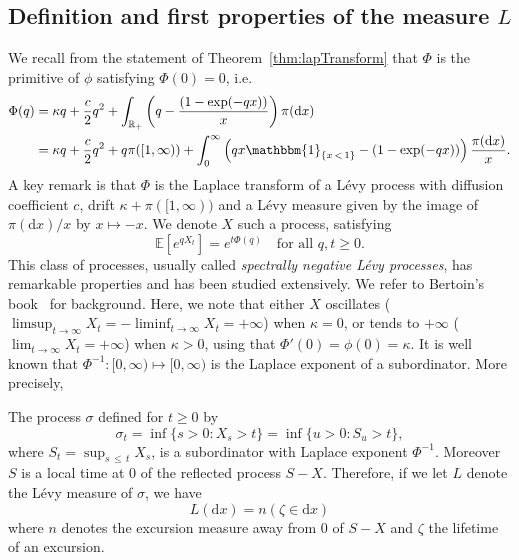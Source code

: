 \documentclass[AHL,Unicode,longabstracts,published]{cedram}
\newcommand{\R}{\mathbb{R}}
\newcommand{\bbE}{\mathbb{E}}
\newcommand{\dd}{\mathrm{d}}
\newcommand{\ind}[1]{\mathbbm{1}_{\left\{#1\right\}}}
\begin{document}
\subsection{Definition and first properties of the measure \texorpdfstring{$L$}{L}}\label{sec:L}

We recall from the statement of Theorem~\ref{thm:lapTransform} that $\Phi$ is the primitive of $\phi$ satisfying $\Phi(0) = 0$, i.e.
\begin{align}\label{LK_Phi}
\Phi(q)&=\kappa q+\frac{c}{2}q^2+\int_{\R _+} \left(q-\frac{\left(1-\exp(-qx)\right)}{x}\right)\pi(\dd x) \\
\nonumber &= \kappa q+\frac{c}{2}q^2+ q \pi([1,\infty))+\int_0^{\infty} \left(qx \ind{x\,<\,1} -\left(1-\exp(-qx)\right)\right) \frac{\pi(\dd x)}{x}.
\end{align}
A key remark is that $\Phi$ is the Laplace transform of a Lévy process with diffusion coefficient $c$, drift $\kappa + \pi([1,\infty))$ and a Lévy measure given by the image of $\pi(\dd x)/x$ by $x \mapsto -x$. We denote $X$ such a process, satisfying
\begin{equation*}\label{def_X}
\bbE\left[e^{qX_t}\right]=e^{t \Phi(q)} \quad \text{for all } q,t \geq 0.
\end{equation*}
This class of processes, usually called \emph{spectrally negative Lévy processes}, has remarkable properties and has been studied extensively. We refer to Bertoin's book~\cite[Chapter~VII]{BLevy} for background. Here, we note that either $X$ oscillates ($\limsup_{t\rightarrow \infty} X_t=-\liminf_{t\rightarrow \infty} X_t=+\infty$) when $\kappa=0$, or tends to $+\infty$ ($\lim_{t\rightarrow \infty} X_t=+\infty$) when $\kappa>0$, using that $\Phi'(0)=\phi(0)=\kappa$. It is well known that $\Phi^{-1}:[0,\infty)\mapsto [0,\infty)$ is the Laplace exponent of a subordinator. More precisely,

\begin{lemm}
The process $\sigma$ defined for $t \geq 0$ by
\[
\sigma_t = \inf\{ s > 0 : X_s > t\}=\inf\{ u >0:S_u>t\},
\]
where $S_t = \sup_{s\,\leq\,t} X_s$, is a subordinator with Laplace exponent $\Phi^{-1}$. Moreover $S$ is a local time at 0 of the reflected process $S-X$. Therefore, if we let $L$ denote the Lévy measure of $\sigma$, we have
\[
L(\dd x)=n(\zeta \in \dd x)
\]
where $n$ denotes the excursion measure away from 0 of $S-X$ and $\zeta$ the lifetime of an excursion.
\end{lemm}
\end{document}
